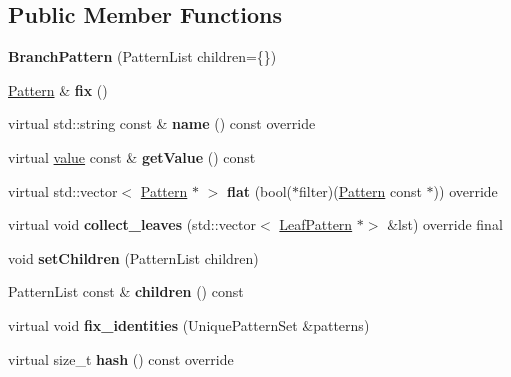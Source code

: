 \subsection*{Public Member Functions}
\begin{DoxyCompactItemize}
\item 
\mbox{\label{classdocopt_1_1BranchPattern_a8a56cbf0c6b730c509cf3922acba2f31}} 
{\bfseries Branch\+Pattern} (Pattern\+List children=\{\})
\item 
\mbox{\label{classdocopt_1_1BranchPattern_ab0c5769d242d5b41c5766ba6d772a34e}} 
\hyperlink{classdocopt_1_1Pattern}{Pattern} \& {\bfseries fix} ()
\item 
\mbox{\label{classdocopt_1_1BranchPattern_abe21ea9bf1f491c64842921bc61d5cdd}} 
virtual std\+::string const  \& {\bfseries name} () const override
\item 
\mbox{\label{classdocopt_1_1BranchPattern_a73fb256384426f7cdad70fcaf13a5195}} 
virtual \hyperlink{structdocopt_1_1value}{value} const  \& {\bfseries get\+Value} () const
\item 
\mbox{\label{classdocopt_1_1BranchPattern_a7927fbc8ea5f3571f6b2e0e941f3b9b4}} 
virtual std\+::vector$<$ \hyperlink{classdocopt_1_1Pattern}{Pattern} $\ast$ $>$ {\bfseries flat} (bool($\ast$filter)(\hyperlink{classdocopt_1_1Pattern}{Pattern} const $\ast$)) override
\item 
\mbox{\label{classdocopt_1_1BranchPattern_a48bfc54d124536d84aca67bee7745c34}} 
virtual void {\bfseries collect\+\_\+leaves} (std\+::vector$<$ \hyperlink{classdocopt_1_1LeafPattern}{Leaf\+Pattern} $\ast$$>$ \&lst) override final
\item 
\mbox{\label{classdocopt_1_1BranchPattern_a1b4609af47df9ebba57067e2cb5d762d}} 
void {\bfseries set\+Children} (Pattern\+List children)
\item 
\mbox{\label{classdocopt_1_1BranchPattern_aa9bb7831bd3335c84de284086fa89d55}} 
Pattern\+List const  \& {\bfseries children} () const
\item 
\mbox{\label{classdocopt_1_1BranchPattern_a46f26e4a11c66913472100a2abdb6463}} 
virtual void {\bfseries fix\+\_\+identities} (Unique\+Pattern\+Set \&patterns)
\item 
\mbox{\label{classdocopt_1_1BranchPattern_a0eb838adc74441c109e38c7a07da2519}} 
virtual size\+\_\+t {\bfseries hash} () const override
\end{DoxyCompactItemize}
